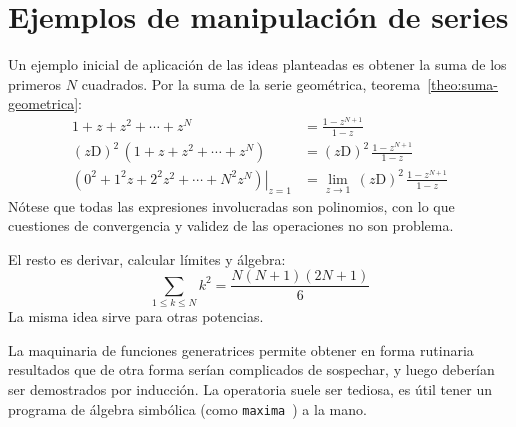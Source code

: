 \section{Ejemplos de manipulación de series}
\label{sec:gf-ejemplos}

  Un ejemplo inicial de aplicación de las ideas planteadas
  es obtener la suma de los primeros \(N\) cuadrados.%
  Por la suma de la serie geométrica,%
  teorema~\ref{theo:suma-geometrica}:
  \begin{align*}
    1 + z + z^2 + \dotsb + z^N
      &= \frac{1 - z^{N + 1}}{1 - z} \\
    (z \mathrm{D})^2 \, \left( 1 + z + z^2 + \dotsb + z^N \right)
      &= (z \mathrm{D})^2 \, \frac{1 - z^{N + 1}}{1 - z} \\
    \left.
      \left( 0^2 + 1^2 z + 2^2 z^2 + \dotsb + N^2 z^N \right)
    \right|_{z = 1}
      &= \lim_{z \rightarrow 1} \,
	   (z \mathrm{D})^2 \, \frac{1 - z^{N + 1}}{1 - z}
  \end{align*}
  Nótese que todas las expresiones involucradas son polinomios,
  con lo que cuestiones de convergencia y validez de las operaciones
  no son problema.

  El resto es derivar,
  calcular límites y álgebra:
  \begin{equation*}
    \sum_{1 \le k \le N} k^2 = \frac{N (N + 1) (2 N + 1)}{6}
  \end{equation*}
  La misma idea sirve para otras potencias.

  La maquinaria de funciones generatrices
  permite obtener en forma rutinaria
  resultados que de otra forma serían complicados de sospechar,
  y luego deberían ser demostrados por inducción.
  La operatoria suele ser tediosa,
  es útil tener un programa de álgebra simbólica
  (como \texttt{maxima}~\cite{maxima14b:_computer_algebra})%
  a la mano.

